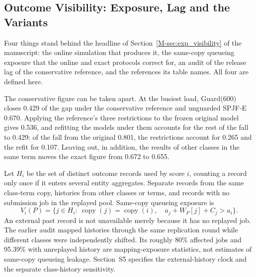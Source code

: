 \documentclass[mathematics,supfile,submit,moreauthors]{Definitions/mdpi}
\newcommand{\devnum}[1]{#1}
\begin{document}

\subsection{Outcome Visibility: Exposure, Lag and the Variants}
\label{sec:supp_visibility}

Four things stand behind the headline of Section~\ref*{M-sec:exp_visibility} of the manuscript: the online
simulation that produces it, the same-copy queueing exposure that the online and exact
protocols correct for, an audit of the release lag of the conservative reference, and the
references its table names. All four are defined here.

The conservative figure can be taken apart. At the busiest load, Guard($\devnum{600}$)
closes \devnum{0.429} of the gap under the conservative reference and unguarded SPJF-E
\devnum{0.670}. Applying the reference's three restrictions to the frozen original model
gives \devnum{0.536}, and refitting the models under them accounts for the rest of the fall
to \devnum{0.429}: of the fall from the original \devnum{0.801}, the restrictions account
for \devnum{0.265} and the refit for \devnum{0.107}. Leaving out, in addition, the results
of other classes in the same term moves the exact figure from \devnum{0.672} to
\devnum{0.655}.

Let $H_i$ be the set of distinct outcome records used by score $i$, counting a record
only once if it enters several entity aggregates. Separate records from the same
class-term copy, histories from other classes or terms, and records with no
submission job in the replayed pool. Same-copy queueing exposure is
\[
 V_i(P)=\{j\in H_i:\ \operatorname{copy}(j)=\operatorname{copy}(i),\quad
             a_j+W_P[j]+C_j>a_i\}.
\]
An external past record is not unavailable merely because it has no replayed job.
The earlier audit mapped histories through the same replication round while
different classes were independently shifted. Its roughly \devnum{80\%} affected
jobs and \devnum{95.39\%} with unreplayed history are mapping-exposure statistics,
not estimates of same-copy queueing leakage. Section~S5 specifies
the external-history clock and the separate class-history sensitivity.
\end{document}
